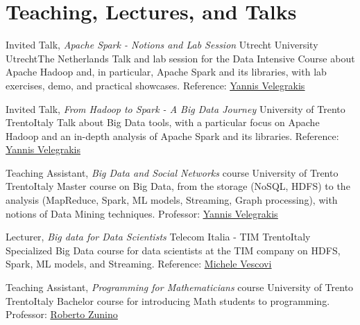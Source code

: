 \documentclass[10pt,a4paper,colorlinks,linkcolor=true]{moderncv}
\newcommand{\cvlink}[2]{\href{#1}{\ul{#2}}}
\begin{document}
\section{Teaching, Lectures, and Talks}

  {Invited Talk, \textit{Apache Spark - Notions and Lab Session}}
  {Utrecht University}
  {Utrecht}{The Netherlands}
  {Talk and lab session for the Data Intensive Course about Apache Hadoop and, in particular, Apache Spark and its libraries, with lab exercises, demo, and practical showcases. Reference: \cvlink{https://scholar.google.it/citations?user=FI1rYesAAAAJ}{Yannis Velegrakis}}

  {Invited Talk, \textit{From Hadoop to Spark - A Big Data Journey}}
  {University of Trento}
  {Trento}{Italy}
  {Talk about Big Data tools, with a particular focus on Apache Hadoop and an in-depth analysis of Apache Spark and its libraries. Reference: \cvlink{https://scholar.google.it/citations?user=FI1rYesAAAAJ}{Yannis Velegrakis}}

  {Teaching Assistant, \textit{Big Data and Social Networks} course}
  {University of Trento}
  {Trento}{Italy}
  {Master course on Big Data, from the storage (NoSQL, HDFS) to the analysis (MapReduce, Spark, ML models, Streaming, Graph processing), with notions of Data Mining techniques. Professor: \cvlink{https://scholar.google.it/citations?user=FI1rYesAAAAJ}{Yannis Velegrakis}}

  {Lecturer, \textit{Big data for Data Scientists}}
  {Telecom Italia - TIM}
  {Trento}{Italy}
  {Specialized Big Data course for data scientists at the TIM company on HDFS, Spark, ML models, and Streaming. Reference: \cvlink{https://www.linkedin.com/in/michele-vescovi/}{Michele Vescovi}}

  {Teaching Assistant, \textit{Programming for Mathematicians} course}
  {University of Trento}
  {Trento}{Italy}
  {Bachelor course for introducing Math students to programming. Professor: \cvlink{https://scholar.google.it/citations?user=ojru0uEAAAAJ}{Roberto Zunino}}


\end{document}
